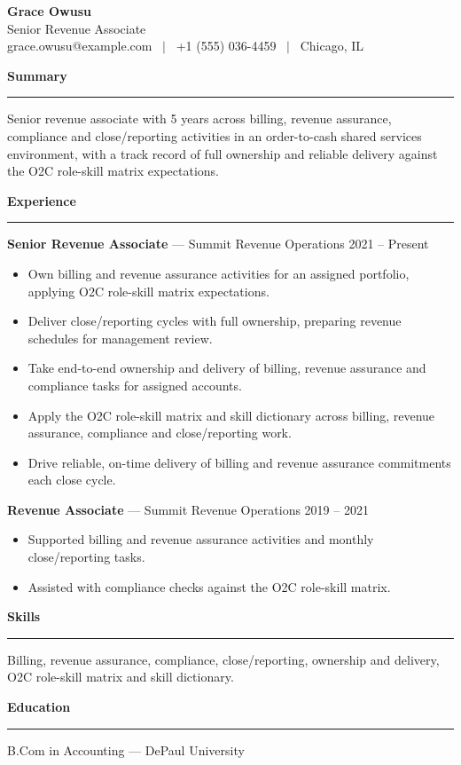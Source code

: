 \documentclass[11pt]{article}
\newcommand{\rsection}[1]{%
  \vspace{10pt}
  {\large\bfseries #1}\\[-4pt]
  \rule{\linewidth}{0.6pt}\vspace{4pt}
}
\begin{document}
\begin{center}
  {\Huge\bfseries Grace Owusu}\\[4pt]
  Senior Revenue Associate \\
  grace.owusu@example.com \ $\vert$ \ +1 (555) 036-4459 \ $\vert$ \ Chicago, IL
\end{center}

\rsection{Summary}
Senior revenue associate with 5 years across billing, revenue assurance, compliance and close/reporting activities in an order-to-cash shared services environment, with a track record of full ownership and reliable delivery against the O2C role-skill matrix expectations.

\rsection{Experience}
\textbf{Senior Revenue Associate} --- Summit Revenue Operations \hfill 2021 -- Present
\begin{itemize}
  \item Own billing and revenue assurance activities for an assigned portfolio, applying O2C role-skill matrix expectations.
  \item Deliver close/reporting cycles with full ownership, preparing revenue schedules for management review.
  \item Take end-to-end ownership and delivery of billing, revenue assurance and compliance tasks for assigned accounts.
  \item Apply the O2C role-skill matrix and skill dictionary across billing, revenue assurance, compliance and close/reporting work.
  \item Drive reliable, on-time delivery of billing and revenue assurance commitments each close cycle.
\end{itemize}

\textbf{Revenue Associate} --- Summit Revenue Operations \hfill 2019 -- 2021
\begin{itemize}
  \item Supported billing and revenue assurance activities and monthly close/reporting tasks.
  \item Assisted with compliance checks against the O2C role-skill matrix.
\end{itemize}

\rsection{Skills}
Billing, revenue assurance, compliance, close/reporting, ownership and delivery, O2C role-skill matrix and skill dictionary.

\rsection{Education}
B.Com in Accounting --- DePaul University
\end{document}
